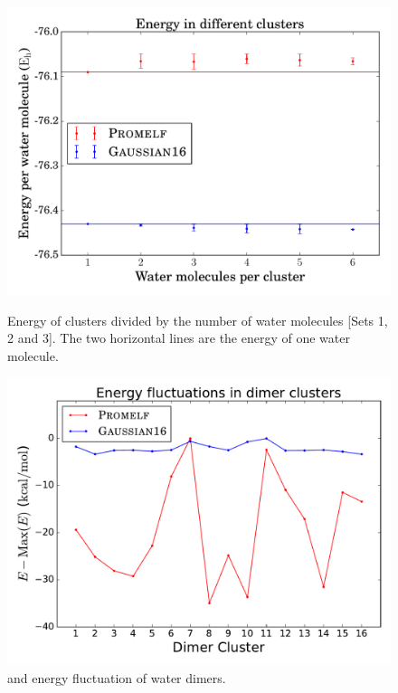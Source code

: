 \begin{figure}[h]
  \begin{minipage}[t]{0.47\textwidth}
    \centering
    \includegraphics[width=\textwidth]{4/plots/promelf/devided.pdf}
    \caption{Energy of clusters divided by the number of water molecules [Sets 1, 2 and 3]. The two horizontal lines
    are the energy of one water molecule.}
    \label{per_water_m}
\end{minipage}
\hfill
\begin{minipage}[t]{0.47\textwidth}
    \centering
    \includegraphics[width=\textwidth]{4/plots/promelf/dimer_energywfn.pdf}
    \caption{{} and {} energy fluctuation of water dimers.}
    \label{fluctuations}
\end{minipage}
\end{figure}

